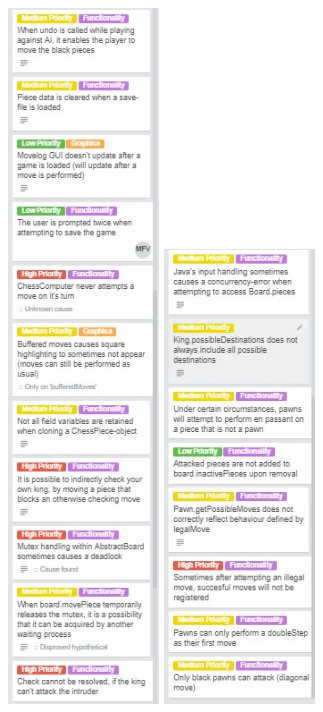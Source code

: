 \documentclass{article}
\begin{document}
\includegraphics[width=4cm]{20180510-bugsfixed2.jpg}
\includegraphics[width=4cm]{20180510-bugsfixed3.jpg}
\end{document}
